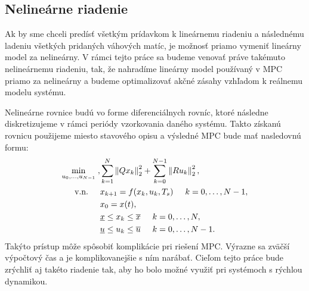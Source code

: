 \subsection{Nelineárne riadenie}
\label{subse:NelinearneMPC}
Ak by sme chceli predísť všetkým prídavkom k lineárnemu riadeniu a následnému ladeniu všetkých pridaných váhových matíc, je možnosť priamo vymeniť lineárny model za nelineárny. V rámci tejto práce sa budeme venovať práve takémuto nelineárnemu riadeniu, tak, že nahradíme lineárny model používaný v MPC priamo za nelineárny a budeme optimalizovať akčné zásahy vzhľadom k reálnemu modelu systému.

Nelineárne rovnice budú vo forme diferenciálnych rovníc, ktoré následne diskretizujeme v rámci periódy vzorkovania daného systému. Takto získanú rovnicu použijeme miesto stavového opisu a výsledné MPC bude mať nasledovnú formu:
\begin{subequations}
	\begin{align}
	\displaystyle \min_{u_0,...,u_{N-1}} \hspace{0.1cm}, & 
	\sum_{k=1}^{N}\left\lVert Qx_k\right\rVert^{2}_{2}+\sum_{k=0}^{N-1}\left\lVert Ru_k\right\rVert^{2}_{2},\\
	\textrm{v.n.} \hspace{0.5cm} & x_{k+1} = f(x_{k},u_{k},T_{s})\hspace{0.5cm} k=0,\dots,N-1,\\
	& x_{0} = x(t),\\
	& \underline{x} \leq x_{k} \leq \overline{x}\hspace{0.5cm} k=0,\dots,N,\\
	& \underline{u} \leq u_{k} \leq \overline{u}\hspace{0.5cm} k=0,\dots,N-1.
	\end{align}
\end{subequations}
Takýto prístup môže spôsobiť komplikácie pri riešení MPC. Výrazne sa zväčší výpočtový čas a je komplikovanejšie s ním narábať. Cieľom tejto práce bude zrýchliť aj takéto riadenie tak, aby ho bolo možné využiť pri systémoch s rýchlou dynamikou.
